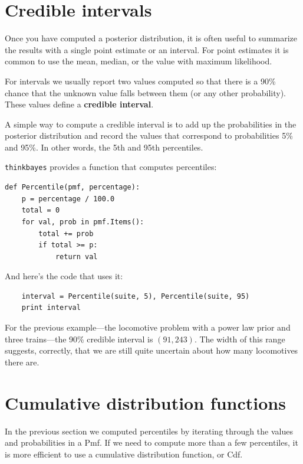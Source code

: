 \documentclass[12pt]{book}
\begin{document}
\section{Credible intervals}
\label{credible}

Once you have computed a posterior distribution, it is often useful
to summarize the results with a single point estimate or an interval.
For point estimates it is common to use the mean, median, or the
value with maximum likelihood.

For intervals we usually report two values computed
so that there is a 90\% chance that the unknown value falls
between them (or any other probability).
These values define a {\bf credible interval}.

A simple way to compute a credible interval is to add up the
probabilities in the posterior distribution and record the values
that correspond to probabilities 5\% and 95\%.  In other words,
the 5th and 95th percentiles.

\verb"thinkbayes" provides a function that computes percentiles:

\begin{verbatim}
def Percentile(pmf, percentage):
    p = percentage / 100.0
    total = 0
    for val, prob in pmf.Items():
        total += prob
        if total >= p:
            return val    
\end{verbatim}

And here's the code that uses it:

\begin{verbatim}
    interval = Percentile(suite, 5), Percentile(suite, 95)
    print interval
\end{verbatim}

For the previous example---the locomotive problem with a power law prior
and three trains---the 90\% credible interval is $(91, 243)$.  The
width of this range suggests, correctly, that we are still quite
uncertain about how many locomotives there are.


\section{Cumulative distribution functions}

In the previous section we computed percentiles by iterating through
the values and probabilities in a Pmf.  If we need to compute more
than a few percentiles, it is more efficient to use a cumulative
distribution function, or Cdf.
\end{document}
